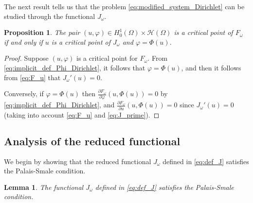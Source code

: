 \documentclass[10pt,a4paper]{amsart}
\numberwithin{equation}{section}
\newtheorem{lemma}[theo]{Lemma}
\newtheorem{proposition}[theo]{Proposition}
\begin{document}
The next result tells us that the problem \eqref{eq:modified_system_Dirichlet} 
can  be studied through the functional $J_\omega$.

\begin{proposition}
 \label{prop:equivalence_F_J_Dirichlet}
The pair $(u, \varphi) \in H_0^1(\Omega) \times \mathcal{H}(\Omega) $ is a critical point of 
$F_\omega$ if and only if $u$ is a critical point of $J_\omega$ and 
$\varphi = \Phi(u)$.
\end{proposition}

\begin{proof}
Suppose $(u, \varphi)$ is a critical point for $F_\omega$. 
From \eqref{eq:implicit_def_Phi_Dirichlet}, it follows that $\varphi = \Phi(u)$, 
and then it follows from \eqref{eq:F_u} that $J_\omega'(u) = 0$.

Conversely, if $\varphi = \Phi(u)$ then 
$\frac{\partial F_\omega}{\partial \varphi}(u, \Phi(u)) = 0$ by 
\eqref{eq:implicit_def_Phi_Dirichlet}, and 
$\frac{\partial F_\omega}{\partial u}(u, \Phi(u)) = 0$ since 
$J_\omega'(u) = 0$ (taking into account \eqref{eq:F_u} and \eqref{eq:J_prime}).
\end{proof}

\subsection{Analysis of the reduced functional}

We begin by showing that the reduced functional $J_\omega$ defined in \eqref{eq:def_J} 
satisfies the Palais-Smale condition.

\begin{lemma}
 \label{lem:PS_condition}
The functional $J_\omega$ defined in \eqref{eq:def_J} satisfies the Palais-Smale 
condition.
\end{lemma}
\end{document}
